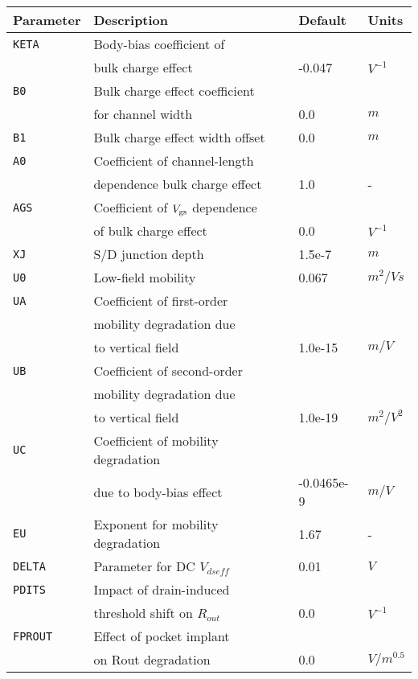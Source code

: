 \documentclass{article}
\begin{document}
\newpage
\begin{table}[H]
\begin{tabular}{|l| l| l| l|}
\hline
\textbf{Parameter} & \textbf{Description} & \textbf{Default} & \textbf{Units} \\
\hline
\texttt{KETA} & Body-bias coefficient of & & \\
              & bulk charge effect & -0.047 & $V^{-1}$\\
\texttt{B0} & Bulk charge effect coefficient & & \\
            & for channel width & 0.0 & $m$\\
\texttt{B1} & Bulk charge effect width offset & 0.0 & $m$\\
\texttt{A0} & Coefficient of channel-length & & \\
            & dependence bulk charge effect & 1.0 & -\\
\texttt{AGS} & Coefficient of $V_{\rm{gs}}$ dependence & & \\
             & of bulk charge effect & 0.0 & $V^{-1}$\\
\texttt{XJ} & S/D junction depth & 1.5e-7 & $m$\\
\texttt{U0} & Low-field mobility & 0.067 & $m^2/Vs$\\
\texttt{UA} & Coefficient of first-order & & \\
            & mobility degradation due & & \\
            & to vertical field & 1.0e-15 & $m/V$\\
\texttt{UB} & Coefficient of second-order & & \\
            & mobility degradation due & & \\
            & to vertical field & 1.0e-19 & $m^2/V^2$\\
\texttt{UC} & Coefficient of mobility degradation & & \\
            & due to body-bias effect & -0.0465e-9 & $m/V$\\
\texttt{EU} & Exponent for mobility degradation & 1.67 & - \\
\texttt{DELTA} & Parameter for DC $V_{dseff}$ & 0.01 & $V$\\
\texttt{PDITS} & Impact of drain-induced & & \\
               & threshold shift on $R_{out}$ & 0.0 & $V^{-1}$\\
\texttt{FPROUT} & Effect of pocket implant & & \\
                & on Rout degradation & 0.0 & $V/m^0.5$\\

\end{tabular}
\end{table}
\end{document}
